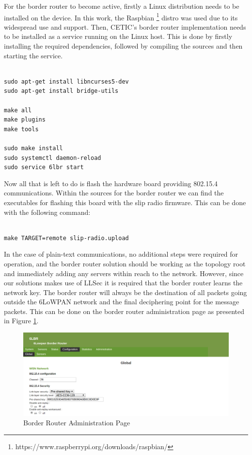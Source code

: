 For the border router to become active, firstly a Linux distribution needs to be installed on the device. In this work, the Raspbian \footnote{https://www.raspberrypi.org/downloads/raspbian/} distro was used due to its widespread use and support. Then, \gls{CETIC}'s border router implementation needs to be installed as a service running on the Linux host. This is done by firstly installing the required dependencies, followed by compiling the sources and then starting the service.

\begin{lstlisting}[caption={Border Router Dependencies and Installation}]

sudo apt-get install libncurses5-dev
sudo apt-get install bridge-utils

make all
make plugins
make tools

sudo make install
sudo systemctl daemon-reload
sudo service 6lbr start

\end{lstlisting}

Now all that is left to do is flash the hardware board providing 802.15.4 communications. Within the sources for the border router we can find the executables for flashing this board with the slip radio firmware. This can be done with the following command:

\begin{lstlisting}[caption={Firmware Upload Command}]

make TARGET=remote slip-radio.upload

\end{lstlisting}

In the case of plain-text communications, no additional steps were required for operation, and the border router solution should be working as the topology root and immediately adding any servers within reach to the network. However, since our solutions makes use of \gls{LLSec} it is required that the border router learns the network key. The border router will always be the destination of all packets going outside the \gls{6LoWPAN} network and the final deciphering point for the message packets. This can be done on the border router administration page as presented in Figure \ref{fig:administration_page}.

\begin{figure}[h]
  \centering
  \includegraphics[width=0.95\linewidth]{figures/border_router_page.png}
  \caption{Border Router Administration Page}
  \label{fig:administration_page}
\end{figure}

